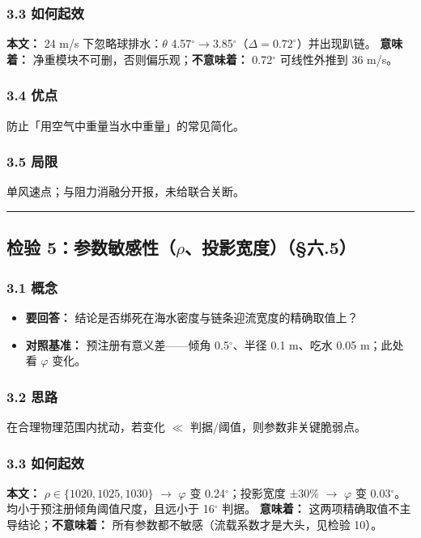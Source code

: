 \documentclass[UTF8,a4paper,zihao=-4]{ctexart}
\begin{document}
\subsubsection{\texorpdfstring{3.3 如何起效}{3.3 如何起效}}
\textbf{本文：} 24 m/s 下忽略球排水：\(\theta\) 4.57$^\circ$$\rightarrow$3.85$^\circ$（\(\Delta=0.72^\circ\)）并出现趴链。  
\textbf{意味着：} 净重模块不可删，否则偏乐观；\textbf{不意味着：} 0.72$^\circ$ 可线性外推到 36 m/s。

\subsubsection{\texorpdfstring{3.4 优点}{3.4 优点}}
防止「用空气中重量当水中重量」的常见简化。

\subsubsection{\texorpdfstring{3.5 局限}{3.5 局限}}
单风速点；与阻力消融分开报，未给联合关断。

\vspace{0.4em}\hrule\vspace{0.4em}

\subsection{\texorpdfstring{检验 5：参数敏感性（\(\rho\)、投影宽度）（§六.5）}{检验 5：参数敏感性（、投影宽度）（§六.5）}}

\subsubsection{\texorpdfstring{3.1 概念}{3.1 概念}}
\begin{itemize}[leftmargin=1.5em]
\item \textbf{要回答：} 结论是否绑死在海水密度与链条迎流宽度的精确取值上？
\item \textbf{对照基准：} 预注册有意义差------倾角 0.5$^\circ$、半径 0.1 m、吃水 0.05 m；此处看 \(\varphi\) 变化。
\end{itemize}

\subsubsection{\texorpdfstring{3.2 思路}{3.2 思路}}
在合理物理范围内扰动，若变化 $\ll$ 判据/阈值，则参数非关键脆弱点。

\subsubsection{\texorpdfstring{3.3 如何起效}{3.3 如何起效}}
\textbf{本文：} \(\rho\in\{1020,1025,1030\}\) $\rightarrow$ \(\varphi\) 变 0.24$^\circ$；投影宽度 ±30\% $\rightarrow$ \(\varphi\) 变 0.03$^\circ$。均小于预注册倾角阈值尺度，且远小于 16$^\circ$ 判据。  
\textbf{意味着：} 这两项精确取值不主导结论；\textbf{不意味着：} 所有参数都不敏感（流载系数才是大头，见检验 10）。
\end{document}

